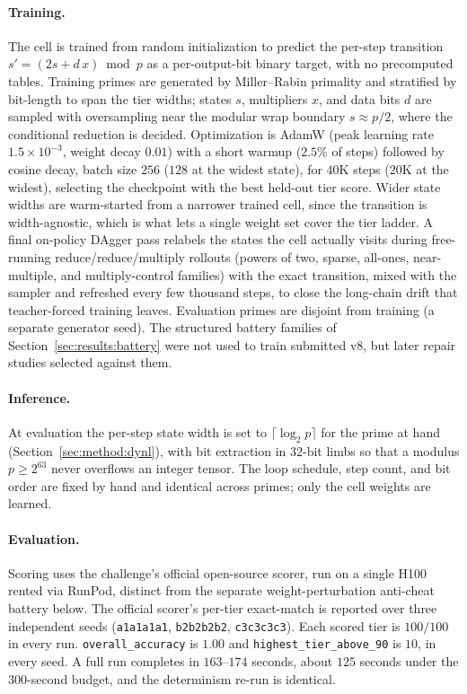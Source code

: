 \documentclass[11pt]{article}
\begin{document}
\paragraph{Training.}
The cell is trained from random initialization to predict the per-step transition
$s' = (2s + d\,x)\bmod p$ as a per-output-bit binary target, with no precomputed
tables. Training primes are generated by Miller--Rabin primality and stratified by
bit-length to span the tier widths; states $s$, multipliers $x$, and data bits $d$
are sampled with oversampling near the modular wrap boundary $s \approx p/2$, where
the conditional reduction is decided. Optimization is AdamW (peak learning rate
$1.5\times10^{-3}$, weight decay $0.01$) with a short warmup ($2.5\%$ of steps)
followed by cosine decay, batch size $256$ ($128$ at the widest state), for $40$K
steps ($20$K at the widest), selecting the checkpoint with the best held-out tier
score. Wider state widths are warm-started from a narrower trained cell, since the
transition is width-agnostic, which is what lets a single weight set cover the tier
ladder. A final on-policy DAgger pass \citep{DAgger2011} relabels the states the
cell actually visits during free-running reduce/reduce/multiply rollouts (powers of
two, sparse, all-ones, near-multiple, and multiply-control families) with the exact
transition, mixed with the sampler and refreshed every few thousand steps, to close
the long-chain drift that teacher-forced training leaves. Evaluation primes are
disjoint from training (a separate generator seed). The structured battery
families of Section~\ref{sec:results:battery} were not used to train submitted v8,
but later repair studies selected against them.

\paragraph{Inference.}
At evaluation the per-step state width is set to $\lceil \log_2 p \rceil$ for the
prime at hand (Section~\ref{sec:method:dynl}), with bit extraction in $32$-bit
limbs so that a modulus $p \ge 2^{63}$ never overflows an integer tensor. The loop
schedule, step count, and bit order are fixed by hand and identical across primes;
only the cell weights are learned.

\paragraph{Evaluation.}
{\sloppy
Scoring uses the challenge's official open-source scorer, run on a single H100 rented via
RunPod, distinct from the separate weight-perturbation anti-cheat battery below. The
official scorer's per-tier exact-match is reported over three independent seeds
(\texttt{a1a1a1a1}, \texttt{b2b2b2b2}, \texttt{c3c3c3c3}).
Each scored tier is $100/100$ in every run.
\texttt{overall\_accuracy} is $1.00$ and \texttt{highest\_tier\_above\_90} is $10$,
in every seed. A full run completes in $163$--$174$ seconds, about $125$ seconds
under the $300$-second budget, and the determinism re-run is identical.
\par}
\end{document}
